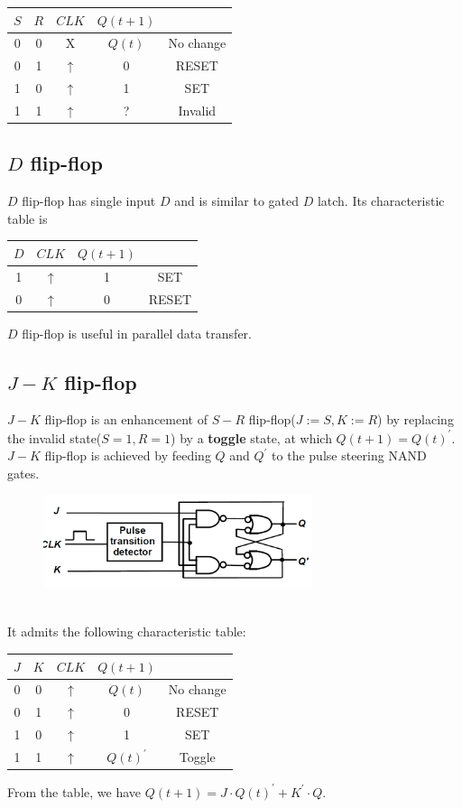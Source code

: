\documentclass[12pt]{article}
\theoremstyle{definition}
\begin{document}
\clearpage\begin{table}[h]
\centering
\begin{tabular}{|c|c|c|c|c|}
\hline
$S$&$R$&$CLK$&$Q(t+1)$&\\\hline
0&0&X&$Q(t)$&No change\\\hline
0&1&$\uparrow$&0&RESET\\\hline
1&0&$\uparrow$&1&SET\\\hline
1&1&$\uparrow$&?&Invalid\\\hline
\end{tabular}
\end{table}
\subsection{$D$ flip-flop}
$D$ flip-flop has single input $D$ and is similar to gated $D$ latch. Its characteristic table is
\begin{table}[h]
\centering
\begin{tabular}{|c|c|c|c|}
\hline
$D$&$CLK$&$Q(t+1)$&\\\hline
1&$\uparrow$&1&SET\\\hline
0&$\uparrow$&0&RESET\\\hline
\end{tabular}
\end{table}
$D$ flip-flop is useful in parallel data transfer.
\subsection{$J-K$ flip-flop}
$J-K$ flip-flop is an enhancement of $S-R$ flip-flop($J:=S, K:=R$) by replacing the invalid state($S=1, R=1$) by a \textbf{toggle} state, at which $Q(t+1) = Q(t)^\prime$.\\
$J-K$ flip-flop is achieved by feeding $Q$ and $Q^\prime$ to the pulse steering NAND gates.
\begin{figure}[h]
\centering
\includegraphics[width = 0.7\textwidth]{8_4.png}
\end{figure}\\
It admits the following characteristic table:\clearpage
\begin{table}[h]
\centering
\begin{tabular}{|c|c|c|c|c|}
\hline
$J$&$K$&$CLK$&$Q(t+1)$&\\\hline
0&0&$\uparrow$&$Q(t)$&No change\\\hline
0&1&$\uparrow$&0&RESET\\\hline
1&0&$\uparrow$&1&SET\\\hline
1&1&$\uparrow$&$Q(t)^\prime$&Toggle\\\hline
\end{tabular}
\end{table}
From the table, we have $Q(t+1) = J\cdot Q(t)^\prime+K^\prime\cdot Q$.
\end{document}
